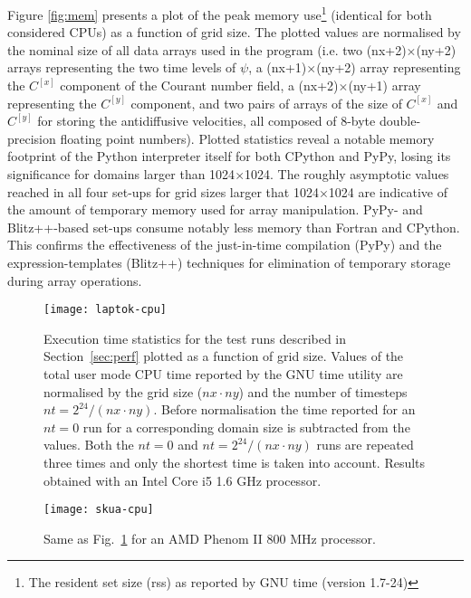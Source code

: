 \documentclass[review,peprint,10pt,5p,times]{elsarticle}
\begin{document}
  Figure \ref{fig:mem} presents a plot of the peak memory use\footnote{The resident set size (rss)
    as reported by GNU time (version 1.7-24)} (identical for both considered CPUs)
    as a function of grid size.
  The plotted values are normalised by the nominal size of all data arrays used in the program
    (i.e. two (nx+2)$\times$(ny+2) arrays representing the two time levels of $\psi$, 
     a (nx+1)$\times$(ny+2) array representing the $C^{[x]}$ component of the Courant number field,
     a (nx+2)$\times$(ny+1) array representing the $C^{[y]}$ component, 
     and two pairs of arrays of the size of $C^{[x]}$ and $C^{[y]}$ for storing the 
     antidiffusive velocities, all composed of 8-byte double-precision floating point numbers).
  Plotted statistics reveal a notable memory footprint of the Python interpreter itself
    for both CPython and PyPy, losing its significance for domains larger than 1024$\times$1024.
  The roughly asymptotic values reached in all four set-ups for grid sizes larger that 1024$\times$1024
    are indicative of the amount of temporary memory used for array manipulation.
  PyPy- and Blitz++-based set-ups consume notably less memory than Fortran and CPython.
  This confirms the effectiveness of the just-in-time compilation (PyPy) and the expression-templates (Blitz++) techniques
    for elimination of temporary storage during array operations.

  \begin{figure}[t]
    \center
    \texttt{[image: laptok-cpu]}
    \caption{\label{fig:cpu-eyrie}
      Execution time statistics for the test runs described in Section~\ref{sec:perf}
        plotted as a function of grid size.
      Values of the total user mode CPU time reported by the GNU time utility are
        normalised by the grid size ($nx \cdot ny$) and the number of timesteps $nt=2^{24}/(nx \cdot ny)$.
      Before normalisation the time reported for an $nt=0$ run for a corresponding
        domain size is subtracted from the values.
      Both the $nt=0$ and $nt=2^{24}/(nx \cdot ny)$ runs are repeated three times and
        only the shortest time is taken into account.
      Results obtained with an Intel\textsuperscript{\textregistered} 
        Core\textsuperscript{\texttrademark} i5 1.6 GHz processor.
    }
  \end{figure}
  \begin{figure}[t]
    \center
    \texttt{[image: skua-cpu]}
    \caption{\label{fig:cpu-skua}
      Same as Fig.~\ref{fig:cpu-eyrie} for an AMD Phenom\textsuperscript{\texttrademark} II 800 MHz processor.
    }
  \end{figure}
\end{document}
